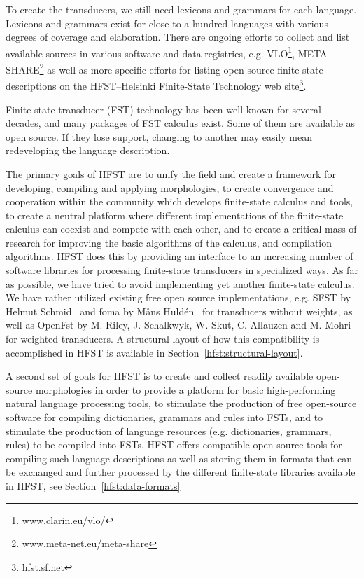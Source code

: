 \documentclass{llncs}
\begin{document}
To create the transducers, we still need lexicons and grammars for each language.
Lexicons and grammars exist for close to a hundred languages with various degrees 
of coverage and elaboration. There are ongoing efforts to collect and list available 
sources in various software and data registries, e.g. VLO\footnote{www.clarin.eu/vlo/}, 
META-SHARE\footnote{www.meta-net.eu/meta-share} as well as more specific
efforts for listing open-source finite-state descriptions on the 
HFST--Helsinki Finite-State Technology web site\footnote{hfst.sf.net}.


Finite-state transducer (FST) technology has been well-known for several 
decades, and many packages of FST calculus exist. Some of them are 
available as open source. If they lose support, changing to another may
easily mean redeveloping the language description. 

The primary goals of HFST are to unify the field and create a framework for developing, 
compiling and applying morphologies, to create convergence and cooperation within the
community which develops finite-state calculus and tools, to create a neutral platform 
where different implementations of the finite-state calculus can coexist and compete 
with each other, and to create a critical mass of research for improving the basic algorithms 
of the calculus, and compilation algorithms.  
HFST does this by providing an interface to an increasing number of software libraries 
for processing finite-state transducers in specialized ways. As far as possible, 
we have tried to avoid implementing yet another finite-state calculus. We have 
rather utilized existing free open source implementations, e.g. SFST by Helmut 
Schmid~\cite{schmid/2005} and foma by Måns Huldén~\cite{hulden/2009} 
for transducers without weights, as well as OpenFst  by M. Riley, J. Schalkwyk, W. Skut, 
C. Allauzen and M. Mohri~\cite{openfst/2007} for weighted transducers. A structural 
layout of how this compatibility is accomplished in HFST is available in Section~\ref{hfst:structural-layout}.

A second set of goals for HFST is to create and collect  
readily available open-source morphologies in order to provide a platform for basic 
high-performing natural language processing tools, to stimulate the production of free 
open-source software for compiling dictionaries, grammars and rules into FSTs, and to 
stimulate the production of language resources (e.g. dictionaries, grammars, rules) to 
be compiled into FSTs. 
HFST offers compatible open-source tools 
for compiling such language descriptions as well as storing them 
in formats that can be exchanged and further processed by the different finite-state libraries 
available in HFST, see Section~\ref{hfst:data-formats}
\end{document}

